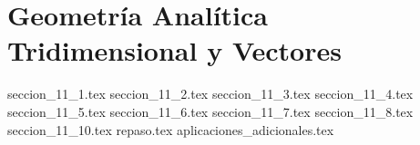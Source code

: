 
\chapter{Geometría Analítica Tridimensional y Vectores}

{seccion_11_1.tex}
{seccion_11_2.tex}
{seccion_11_3.tex}
{seccion_11_4.tex}
{seccion_11_5.tex}
{seccion_11_6.tex}
{seccion_11_7.tex}
{seccion_11_8.tex}
{seccion_11_10.tex}
{repaso.tex}
{aplicaciones_adicionales.tex}
